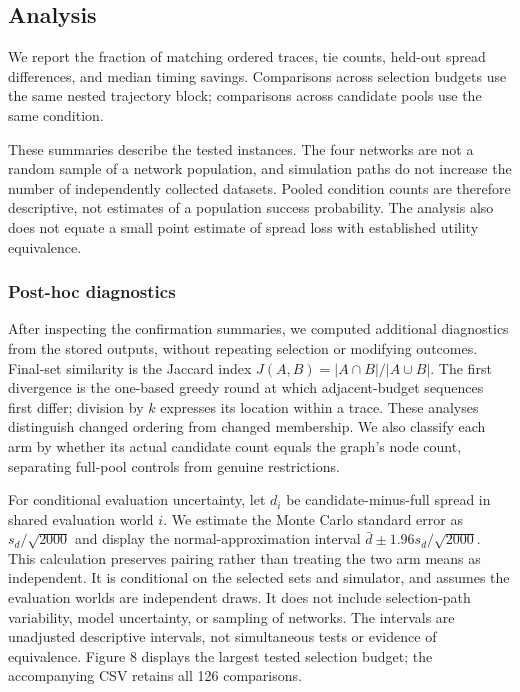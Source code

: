 \documentclass[smallextended]{svjour3}
\begin{document}
\subsection{Analysis}

We report the fraction of matching ordered traces, tie counts, held-out spread differences, and median timing savings. Comparisons across selection budgets use the same nested trajectory block; comparisons across candidate pools use the same condition.

These summaries describe the tested instances. The four networks are not a random sample of a network population, and simulation paths do not increase the number of independently collected datasets. Pooled condition counts are therefore descriptive, not estimates of a population success probability. The analysis also does not equate a small point estimate of spread loss with established utility equivalence.


\subsubsection{Post-hoc diagnostics}

After inspecting the confirmation summaries, we computed additional diagnostics from the stored outputs, without repeating selection or modifying outcomes. Final-set similarity is the Jaccard index \(J(A,B)=|A\cap B|/|A\cup B|\). The first divergence is the one-based greedy round at which adjacent-budget sequences first differ; division by \(k\) expresses its location within a trace. These analyses distinguish changed ordering from changed membership. We also classify each arm by whether its actual candidate count equals the graph's node count, separating full-pool controls from genuine restrictions.

For conditional evaluation uncertainty, let \(d_{i}\) be candidate-minus-full spread in shared evaluation world \(i\). We estimate the Monte Carlo standard error as \(s_{d}/\sqrt{2000}\) and display the normal-approximation interval \(\bar{d}\pm 1.96s_{d}/\sqrt{2000}\). This calculation preserves pairing rather than treating the two arm means as independent. It is conditional on the selected sets and simulator, and assumes the evaluation worlds are independent draws. It does not include selection-path variability, model uncertainty, or sampling of networks. The intervals are unadjusted descriptive intervals, not simultaneous tests or evidence of equivalence. Figure 8 displays the largest tested selection budget; the accompanying CSV retains all 126 comparisons.
\end{document}
